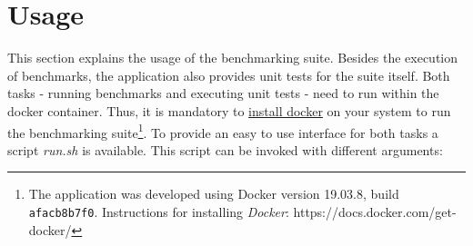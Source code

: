 \section{Usage}\label{sec:benchmarks_usage}
This section explains the usage of the benchmarking suite. Besides the execution of benchmarks, the application also provides unit tests for the suite itself. Both tasks - running benchmarks and executing unit tests - need to run within the docker container. Thus, it is mandatory to \href{https://docs.docker.com/get-docker/}{install docker} on your system to run the benchmarking suite\footnote{The application was developed using Docker version 19.03.8, build \texttt{afacb8b7f0}. Instructions for installing \textit{Docker}: https://docs.docker.com/get-docker/}. To provide an easy to use interface for both tasks a script \textit{run.sh} is available. This script can be invoked with different arguments:
